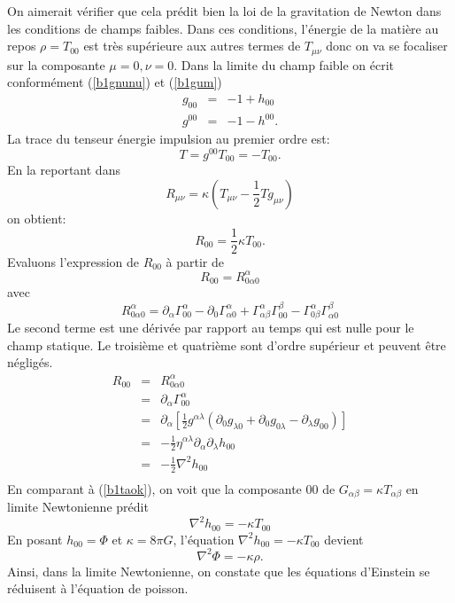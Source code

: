 \documentclass[a4paper,12pt]{report}
\theoremstyle{plain}
\theoremstyle{plain}
\begin{document}
On aimerait v\'erifier que cela pr\'edit bien la loi de la gravitation de Newton dans les conditions de champs faibles.  
Dans ces conditions,  l'\'energie de la mati\`ere au repos $ \rho =T_{00} $  est tr\`es sup\'erieure aux autres
termes de  $ T_{\mu\nu}$ donc on va se focaliser sur la composante $ \mu=0,  \nu=0 $.   Dans la limite du
champ faible on \'ecrit conform\'ement  (\ref{b1gnunu}) et (\ref{b1gum}) \\

\begin{eqnarray}
 g_{00} &=& -1 + h_{00} \\ 
g^{00} &=& -1 - h^{00}.    
\end{eqnarray}
La trace du tenseur \'energie impulsion au premier ordre est:
$$   T=g^{00}T_{00}=-T_{00}.           $$
En la reportant  dans $$ R_{\mu\nu}=\kappa(T_{\mu\nu}-\frac{1}{2}T g_{\mu\nu})$$ on obtient:\\
\begin{equation}\label{b1taok}
  R_{00}= \frac{1}{2}\kappa T_{00}.   
\end{equation}        
Evaluons l'expression de $ R_{00} $ \`a partir de
$$R_{00}=R^{\alpha}_{0 \alpha 0} $$
 avec 
$$ R^{\alpha}_{0 \alpha 0}= \partial_{\alpha}\Gamma^{\alpha}_{00} -\partial_{0}\Gamma^{\alpha}_{\alpha 0}  + \Gamma^{\alpha}_{\alpha\beta}\Gamma^{\beta}_{00} -\Gamma^{\alpha}_{0 \beta}\Gamma^{\beta}_{\alpha 0}  $$
Le second terme est une d\'eriv\'ee par rapport au temps qui est nulle pour le champ statique.  
Le troisi\`eme et quatri\`eme sont d'ordre sup\'erieur et peuvent \^etre n\'eglig\'es.  
\begin{eqnarray*}
 R_{00} &=& R^{\alpha}_{0 \alpha 0} \\
         & = & \partial_{\alpha}\Gamma^{\alpha}_{00} \\
        & = & \partial_{\alpha}[\frac{1}{2}g^{\alpha \lambda}(\partial_{0}g_{\lambda 0}+ \partial_{0}g_{0 \lambda }-\partial_{\lambda}g_{0 0} ) ]\\
         &= & -\frac{1}{2}\eta^{\alpha \lambda } \partial_{\alpha}\partial_{\lambda} h_{00} \\
         &  = &- \frac{1}{2} \nabla^{2}h_{00} \\
\end{eqnarray*}
En comparant \`a (\ref{b1taok}),  on voit que la composante $00$ de $ G_{\alpha\beta}= \kappa T_{\alpha\beta}$  en limite Newtonienne pr\'edit \\
$$  \nabla^{2}h_{00}= -\kappa T_{00} $$
En posant $ h_{00} = \Phi$ et  $\kappa = 8 \pi G $,  l'\'equation $ \nabla^{2}h_{00}= -\kappa T_{00} $ devient
$$  \nabla^{2} \Phi = -\kappa \rho.   $$
Ainsi, dans la limite Newtonienne, on constate que les \'equations d'Einstein se r\'eduisent \`a l'\'equation de poisson. 
\end{document}

